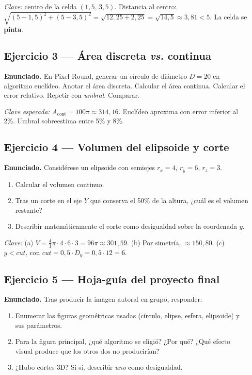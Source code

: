 \documentclass[12pt,a4paper]{scrartcl}
\newcommand{\acc}[1]{\textcolor{accent}{\textbf{#1}}}
\begin{document}
\emph{Clave:} centro de la celda $(1{,}5,\, 3{,}5)$. Distancia al centro: $\sqrt{(5{-}1{,}5)^2 + (5{-}3{,}5)^2} = \sqrt{12{,}25 + 2{,}25} = \sqrt{14{,}5} \approx 3{,}81 < 5$. La celda se \acc{pinta}.

\subsection*{Ejercicio 3 --- Área discreta \emph{vs.} continua}
\textbf{Enunciado.} En Pixel Round, generar un círculo de diámetro $D = 20$ en algoritmo euclídeo. Anotar el área discreta. Calcular el área continua. Calcular el error relativo. Repetir con \emph{umbral}. Comparar.

\emph{Clave esperada:} $A_{\text{cont}} = 100\pi \approx 314{,}16$. Euclídeo aproxima con error inferior al 2\%. Umbral sobreestima entre 5\% y 8\%.

\subsection*{Ejercicio 4 --- Volumen del elipsoide y corte}
\textbf{Enunciado.} Considérese un elipsoide con semiejes $r_x = 4$, $r_y = 6$, $r_z = 3$.
\begin{enumerate}[label=\alph*),leftmargin=1.5em,itemsep=0.1em,topsep=0.2em,nosep]
  \item Calcular el volumen continuo.
  \item Tras un corte en el eje $Y$ que conserva el 50\% de la altura, ¿cuál es el volumen restante?
  \item Describir matemáticamente el corte como desigualdad sobre la coordenada $y$.
\end{enumerate}

\emph{Clave:}
(a) $V = \tfrac{4}{3}\pi \cdot 4 \cdot 6 \cdot 3 = 96\pi \approx 301{,}59$.
(b) Por simetría, $\approx 150{,}80$.
(c) $y < \mathit{cut}$, con $\mathit{cut} = 0{,}5 \cdot D_y = 0{,}5 \cdot 12 = 6$.

\subsection*{Ejercicio 5 --- Hoja-guía del proyecto final}
\textbf{Enunciado.} Tras producir la imagen autoral en grupo, responder:
\begin{enumerate}[label=(\arabic*),leftmargin=1.7em,itemsep=0.15em,topsep=0.2em,nosep]
  \item Enumerar las figuras geométricas usadas (círculo, elipse, esfera, elipsoide) y sus parámetros.
  \item Para la figura principal, ¿qué algoritmo se eligió? ¿Por qué? ¿Qué efecto visual produce que los otros dos no producirían?
  \item ¿Hubo cortes 3D? Si sí, describir \emph{uno} como desigualdad.
\end{enumerate}
\end{document}
